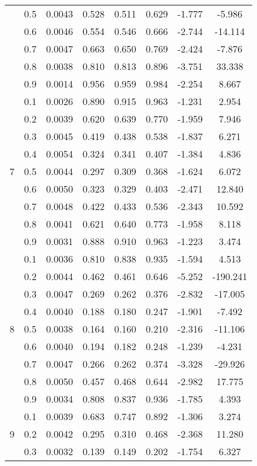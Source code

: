 \documentclass[11pt,a4paper]{report}
\begin{document}
\begin{longtable}{ | c | c || c | c | c | c | c | c | }
 & 0.5 & 0.0043 & 0.528 & 0.511 & 0.629 & -1.777 & -5.986 \\
 & 0.6 & 0.0046 & 0.554 & 0.546 & 0.666 & -2.744 & -14.114 \\
 & 0.7 & 0.0047 & 0.663 & 0.650 & 0.769 & -2.424 & -7.876 \\
 & 0.8 & 0.0038 & 0.810 & 0.813 & 0.896 & -3.751 & 33.338 \\
 & 0.9 & 0.0014 & 0.956 & 0.959 & 0.984 & -2.254 & 8.667 \\
 \hline
\multirow{9}{*}{7} & 0.1 & 0.0026 & 0.890 & 0.915 & 0.963 & -1.231 & 2.954 \\
 & 0.2 & 0.0039 & 0.620 & 0.639 & 0.770 & -1.959 & 7.946 \\
 & 0.3 & 0.0045 & 0.419 & 0.438 & 0.538 & -1.837 & 6.271 \\
 & 0.4 & 0.0054 & 0.324 & 0.341 & 0.407 & -1.384 & 4.836 \\
 & 0.5 & 0.0044 & 0.297 & 0.309 & 0.368 & -1.624 & 6.072 \\
 & 0.6 & 0.0050 & 0.323 & 0.329 & 0.403 & -2.471 & 12.840 \\
 & 0.7 & 0.0048 & 0.422 & 0.433 & 0.536 & -2.343 & 10.592 \\
 & 0.8 & 0.0041 & 0.621 & 0.640 & 0.773 & -1.958 & 8.118 \\
 & 0.9 & 0.0031 & 0.888 & 0.910 & 0.963 & -1.223 & 3.474 \\
 \hline
\multirow{9}{*}{8} & 0.1 & 0.0036 & 0.810 & 0.838 & 0.935 & -1.594 & 4.513 \\
 & 0.2 & 0.0044 & 0.462 & 0.461 & 0.646 & -5.252 & -190.241 \\
 & 0.3 & 0.0047 & 0.269 & 0.262 & 0.376 & -2.832 & -17.005 \\
 & 0.4 & 0.0040 & 0.188 & 0.180 & 0.247 & -1.901 & -7.492 \\
 & 0.5 & 0.0038 & 0.164 & 0.160 & 0.210 & -2.316 & -11.106 \\
 & 0.6 & 0.0040 & 0.194 & 0.182 & 0.248 & -1.239 & -4.231 \\
 & 0.7 & 0.0047 & 0.266 & 0.262 & 0.374 & -3.328 & -29.926 \\
 & 0.8 & 0.0050 & 0.457 & 0.468 & 0.644 & -2.982 & 17.775 \\
 & 0.9 & 0.0034 & 0.808 & 0.837 & 0.936 & -1.785 & 4.393 \\
 \hline
\multirow{9}{*}{9} & 0.1 & 0.0039 & 0.683 & 0.747 & 0.892 & -1.306 & 3.274 \\
 & 0.2 & 0.0042 & 0.295 & 0.310 & 0.468 & -2.368 & 11.280 \\
 & 0.3 & 0.0032 & 0.139 & 0.149 & 0.202 & -1.754 & 6.327 \\

\end{longtable}
\end{document}
